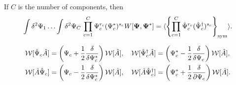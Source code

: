 \begin{theorem}
\label{thm:formalism:func-wigner:mc-moments}
If $C$ is the number of components, then
\[
	\int \delta^2\Psi_1 \ldots \int \delta^2\Psi_C\,
		\prod_{c=1}^C \Psi_c^{r_c} (\Psi_c^*)^{s_c} W[\boldsymbol{\Psi}, \boldsymbol{\Psi}^*]
	= \langle \left\{  \prod_{c=1}^C \hat{\Psi}_c^{r_c} (\hat{\Psi}_c^\dagger)^{s_c}  \right\}_{\mathrm{sym}} \rangle.
\]
\end{theorem}

\begin{theorem}
\label{thm:formalism:func-wigner:mc-correspondences}
\begin{equation*}
\begin{split}
	\mathcal{W} [ \hat{\Psi}_c \hat{A} ]
		& = \left( \Psi_c + \frac{1}{2} \frac{\delta}{\delta \Psi_c^*} \right) \mathcal{W}[\hat{A}],
	\quad
	\mathcal{W} [ \hat{\Psi}_c^\dagger \hat{A} ]
		= \left( \Psi_c^* - \frac{1}{2} \frac{\delta}{\delta \Psi_c} \right) \mathcal{W}[\hat{A}], \\
	\mathcal{W} [ \hat{A} \hat{\Psi}_c ]
		& = \left( \Psi_c - \frac{1}{2} \frac{\delta}{\delta \Psi_c^*} \right) \mathcal{W}[\hat{A}],
	\quad
	\mathcal{W} [ \hat{A} \hat{\Psi}_c^\dagger ]
		= \left( \Psi_c^* + \frac{1}{2} \frac{\delta}{\partial \Psi_c} \right) \mathcal{W}[\hat{A}].
\end{split}
\end{equation*}
\end{theorem}
